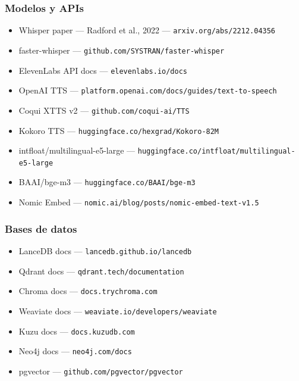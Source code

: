 \documentclass[11pt,a4paper]{article}
\begin{document}
\subsubsection{Modelos y APIs}
\begin{itemize}[leftmargin=*,itemsep=1pt]
\item Whisper paper — Radford et al., 2022 — \texttt{arxiv.org/abs/2212.04356}
\item faster-whisper — \texttt{github.com/SYSTRAN/faster-whisper}
\item ElevenLabs API docs — \texttt{elevenlabs.io/docs}
\item OpenAI TTS — \texttt{platform.openai.com/docs/guides/text-to-speech}
\item Coqui XTTS v2 — \texttt{github.com/coqui-ai/TTS}
\item Kokoro TTS — \texttt{huggingface.co/hexgrad/Kokoro-82M}
\item intfloat/multilingual-e5-large — \texttt{huggingface.co/intfloat/multilingual-e5-large}
\item BAAI/bge-m3 — \texttt{huggingface.co/BAAI/bge-m3}
\item Nomic Embed — \texttt{nomic.ai/blog/posts/nomic-embed-text-v1.5}
\end{itemize}

\subsubsection{Bases de datos}
\begin{itemize}[leftmargin=*,itemsep=1pt]
\item LanceDB docs — \texttt{lancedb.github.io/lancedb}
\item Qdrant docs — \texttt{qdrant.tech/documentation}
\item Chroma docs — \texttt{docs.trychroma.com}
\item Weaviate docs — \texttt{weaviate.io/developers/weaviate}
\item Kuzu docs — \texttt{docs.kuzudb.com}
\item Neo4j docs — \texttt{neo4j.com/docs}
\item pgvector — \texttt{github.com/pgvector/pgvector}
\end{itemize}
\end{document}
